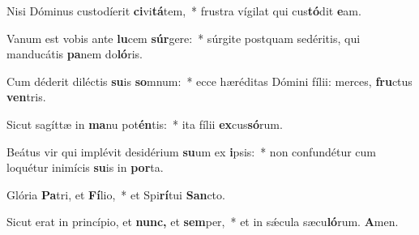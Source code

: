 \item Nisi Dóminus custodíerit \textbf{ci}vi\textbf{tá}tem,~* frustra vígilat qui cus\textbf{tó}dit \textbf{e}am.
\item Vanum est vobis ante \textbf{lu}cem \textbf{súr}gere:~* súrgite postquam sedéritis, qui manducátis \textbf{pa}nem do\textbf{ló}ris.
\item Cum déderit diléctis \textbf{su}is \textbf{so}mnum:~* ecce hæréditas Dómini fílii: merces, \textbf{fru}ctus \textbf{ven}tris.
\item Sicut sagíttæ in \textbf{ma}nu pot\textbf{én}tis:~* ita fílii \textbf{ex}cus\textbf{só}rum.
\item Beátus vir qui implévit desidérium \textbf{su}um ex \textbf{i}psis:~* non confundétur cum loquétur inimícis \textbf{su}is in \textbf{por}ta.
\item Glória \textbf{Pa}tri, et \textbf{Fí}lio,~* et Spi\textbf{rí}tui \textbf{San}cto.
\item Sicut erat in princípio, et \textbf{nunc,} et \textbf{sem}per,~* et in sǽcula sæcu\textbf{ló}rum. \textbf{A}men.